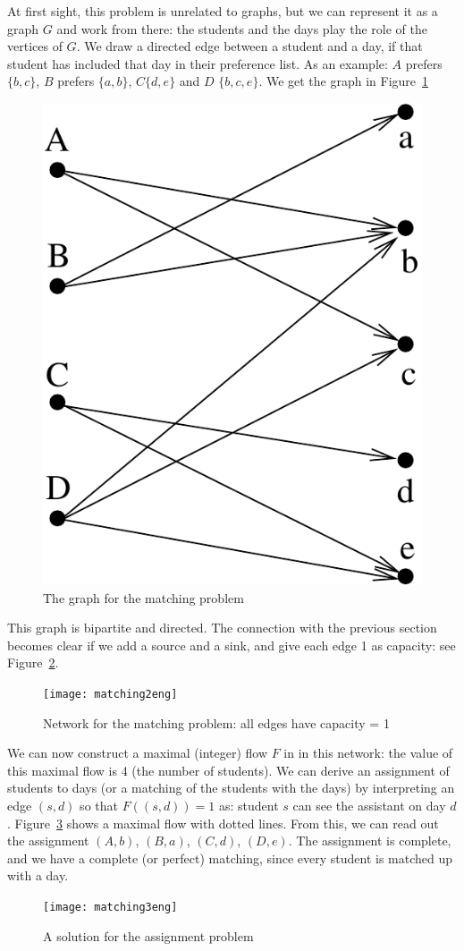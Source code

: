 At first sight, this problem is unrelated to graphs, but we can
represent it as a graph $G$ and work from there: the students and the
days play the role of the vertices of $G$. We draw a directed edge
between a student and a day, if that student has included that day in
their preference list. As an example: $A$ prefers $\{b,c\}$, $B$
prefers $\{a,b\}$, $C \{d,e\}$ and $D$ $\{b,c,e\}$. We get the graph
in Figure~\ref{matching1}

\begin{figure}[ht]
\begin{center}
\includegraphics[width=0.17\linewidth,keepaspectratio]{matching1} %
\end{center}
\caption{The graph for the matching problem\label{matching1}}
\end{figure}

This graph is bipartite and directed. The connection with the previous
section becomes clear if we add a source and a sink, and give each
edge 1 as capacity: see Figure~\ref{matching2}.

\begin{figure}[ht]
\begin{center}
\texttt{[image: matching2eng]} %
\end{center}
\caption{Network for the matching problem: all edges have capacity =
1\label{matching2}}
\end{figure}

We can now construct a maximal (integer) flow $F$ in in this network:
the value of this maximal flow is 4 (the number of students). We can
derive an assignment of students to days (or a matching of the
students with the days) by interpreting an edge $(s,d)$ so that
$F((s,d)) = 1$ as: student $s$ can see the assistant on day
$d$. Figure~\ref{matching3} shows a maximal flow with dotted lines. From this, we
can read out the assignment $(A,b)$, $(B,a)$, $(C,d)$,
$(D,e)$. The assignment is complete, and we have a complete (or
perfect) matching, since every student is matched up with a day.

\begin{figure}[ht]
\begin{center}
\texttt{[image: matching3eng]} %
\end{center}
\caption{A solution for the assignment problem\label{matching3}}
\end{figure}

